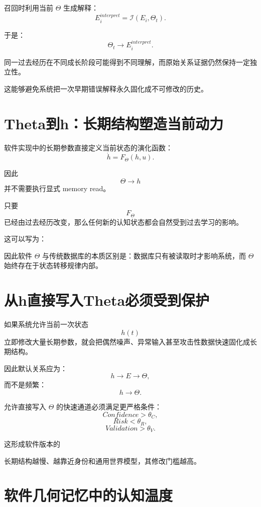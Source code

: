 召回时利用当前 $\Theta$ 生成解释：
\[
E_i^{interpret}
=
\mathcal I(E_i,\Theta_t).
\]

于是：
\[
\boxed{
\Theta_t
\rightarrow
E_i^{interpret}.
}
\]

同一过去经历在不同成长阶段可能得到不同理解，而原始关系证据仍然保持一定独立性。

这能够避免系统把一次早期错误解释永久固化成不可修改的历史。

\section{Theta到h：长期结构塑造当前动力}

软件实现中的长期参数直接定义当前状态的演化函数：
\[
\dot h
=
F_\Theta(h,u).
\]

因此
\[
\Theta\rightarrow h
\]
并不需要执行显式 memory read。

只要
\[
F_\Theta
\]
已经由过去经历改变，那么任何新的认知状态都会自然受到过去学习的影响。

这可以写为：
\begin{statementbox}
\centering
{}
\end{statementbox}

因此软件 $\Theta$ 与传统数据库的本质区别是：数据库只有被读取时才影响系统，而 $\Theta$ 始终存在于状态转移规律内部。

\section{从h直接写入Theta必须受到保护}

如果系统允许当前一次状态
\[
h(t)
\]
立即修改大量长期参数，就会把偶然噪声、异常输入甚至攻击性数据快速固化成长期结构。

因此默认关系应为：
\[
\boxed{
h
\rightarrow
E
\rightarrow
\Theta,
}
\]
而不是频繁：
\[
h\rightarrow\Theta.
\]

允许直接写入 $\Theta$ 的快速通道必须满足更严格条件：
\[
Confidence>\theta_C,
\]
\[
Risk<\theta_R,
\]
\[
Validation>\theta_V.
\]

这形成软件版本的
\begin{statementbox}
\centering
{}
\end{statementbox}

长期结构越慢、越靠近身份和通用世界模型，其修改门槛越高。

\section{软件几何记忆中的认知温度}

